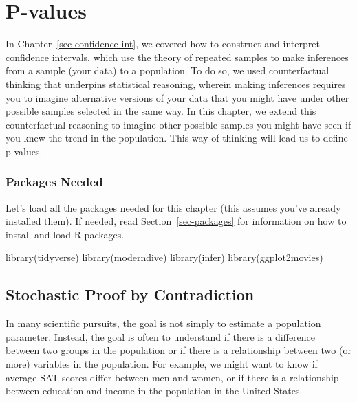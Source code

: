 \documentclass[
  letterpaper,
  DIV=11,
  numbers=noendperiod]{scrreprt}
\newenvironment{Shaded}{\begin{snugshade}}{\end{snugshade}}
\newcommand{\FunctionTok}[1]{\textcolor[rgb]{0.28,0.35,0.67}{#1}}
\newcommand{\NormalTok}[1]{\textcolor[rgb]{0.00,0.23,0.31}{#1}}
\theoremstyle{definition}
\theoremstyle{remark}
\begin{document}
\hypertarget{sec-pvalues}{%
\chapter{P-values}\label{sec-pvalues}}

In Chapter~\ref{sec-confidence-int}, we covered how to construct and
interpret confidence intervals, which use the theory of repeated samples
to make inferences from a sample (your data) to a population. To do so,
we used counterfactual thinking that underpins statistical reasoning,
wherein making inferences requires you to imagine alternative versions
of your data that you might have under other possible samples selected
in the same way. In this chapter, we extend this counterfactual
reasoning to imagine other possible samples you might have seen if you
knew the trend in the population. This way of thinking will lead us to
define p-values.

\hypertarget{packages-needed-4}{%
\subsection*{Packages Needed}\label{packages-needed-4}}

Let's load all the packages needed for this chapter (this assumes you've
already installed them). If needed, read Section~\ref{sec-packages} for
information on how to install and load R packages.

\begin{Shaded}
\begin{Highlighting}[]
\FunctionTok{library}\NormalTok{(tidyverse)}
\FunctionTok{library}\NormalTok{(moderndive)}
\FunctionTok{library}\NormalTok{(infer)}
\FunctionTok{library}\NormalTok{(ggplot2movies)}
\end{Highlighting}
\end{Shaded}

\hypertarget{sec-proof-by-contradiction}{%
\section{Stochastic Proof by
Contradiction}\label{sec-proof-by-contradiction}}

In many scientific pursuits, the goal is not simply to estimate a
population parameter. Instead, the goal is often to understand if there
is a difference between two groups in the population or if there is a
relationship between two (or more) variables in the population. For
example, we might want to know if average SAT scores differ between men
and women, or if there is a relationship between education and income in
the population in the United States.
\end{document}
